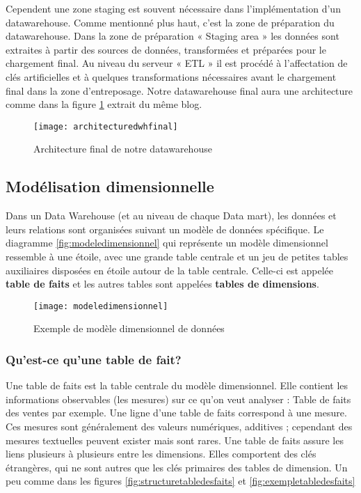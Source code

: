 Cependent une zone staging est souvent nécessaire dans l'implémentation d'un datawarehouse. Comme mentionné plus haut, c'est la zone de préparation du datawarehouse. Dans la zone de préparation « Staging area » les données sont extraites à partir des sources de données, transformées et préparées pour le chargement final. Au niveau du serveur « ETL » il est procédé à l’affectation de clés artificielles et à quelques transformations nécessaires avant le chargement final dans la zone d’entreposage. Notre datawarehouse final aura une architecture comme dans la figure \ref{fig:architecturedwhfinal} extrait du même blog.

\begin{figure}[H]
    \centering
    \texttt{[image: architecturedwhfinal]}
    \caption{Architecture final de notre datawarehouse}
    \label{fig:architecturedwhfinal}
\end{figure}

\subsection{Modélisation dimensionnelle}
Dans un Data Warehouse (et au niveau de chaque Data mart), les données et leurs relations sont organisées suivant un modèle de données spécifique. Le diagramme \ref{fig:modeledimensionnel} qui représente un modèle dimensionnel ressemble à une étoile, avec une grande table centrale et un jeu de petites tables auxiliaires disposées en étoile autour de la table centrale. Celle-ci est appelée \textbf{table de faits} et les autres tables sont appelées \textbf{tables de dimensions}.

\begin{figure}[H]
    \centering
    \texttt{[image: modeledimensionnel]}
    \caption{Exemple de modèle dimensionnel de données}
    \label{fig:modeledimensionnelle}
\end{figure}

\subsubsection{Qu’est-ce qu’une table de fait?}
Une table de faits est la table centrale du modèle dimensionnel. Elle contient les informations observables (les mesures) sur ce qu’on veut analyser : Table de faits des ventes par exemple. Une ligne d’une table de faits correspond à une mesure. Ces mesures sont généralement des valeurs numériques, additives ; cependant des mesures textuelles peuvent exister mais sont rares. Une table de faits assure les liens plusieurs à plusieurs entre les dimensions. Elles comportent des clés étrangères, qui ne sont autres que les clés primaires des tables de dimension. Un peu comme dans les figures \ref{fig:structuretabledesfaits} et \ref{fig:exempletabledesfaits}

